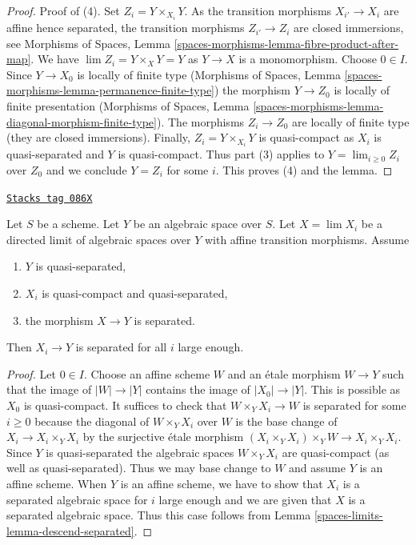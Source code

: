 \begin{proof}
\medskip\noindent
Proof of (4). Set $Z_i = Y \times_{X_i} Y$.
As the transition morphisms $X_{i'} \to X_i$ are affine hence separated,
the transition morphisms $Z_{i'} \to Z_i$ are closed immersions, see
Morphisms of Spaces, Lemma
\ref{spaces-morphisms-lemma-fibre-product-after-map}.
We have $\lim Z_i = Y \times_X Y = Y$ as $Y \to X$ is a monomorphism.
Choose $0 \in I$. Since $Y \to X_0$ is locally of finite type
(Morphisms of Spaces, Lemma
\ref{spaces-morphisms-lemma-permanence-finite-type})
the morphism $Y \to Z_0$ is locally of finite presentation
(Morphisms of Spaces, Lemma
\ref{spaces-morphisms-lemma-diagonal-morphism-finite-type}).
The morphisms $Z_i \to Z_0$ are locally of finite type
(they are closed immersions).
Finally, $Z_i = Y \times_{X_i} Y$ is quasi-compact as
$X_i$ is quasi-separated and $Y$ is quasi-compact.
Thus part (3) applies to $Y = \lim_{i \geq 0} Z_i$ over $Z_0$
and we conclude $Y = Z_i$ for some $i$. This proves (4) and the lemma.
\end{proof}

\begin{lemma}
\label{spaces-limits-lemma-eventually-separated}
\href{https://stacks.math.columbia.edu/tag/086X}{\texttt{Stacks tag 086X}}

Let $S$ be a scheme. Let $Y$ be an algebraic space over $S$.
Let $X = \lim X_i$ be a directed limit of algebraic spaces over $Y$
with affine transition morphisms. Assume
\begin{enumerate}
\item $Y$ is quasi-separated,
\item $X_i$ is quasi-compact and quasi-separated,
\item the morphism $X \to Y$ is separated.
\end{enumerate}
Then $X_i \to Y$ is separated for all $i$ large enough.
\end{lemma}

\begin{proof}
Let $0 \in I$. Choose an affine scheme $W$ and an \'etale morphism
$W \to Y$ such that the image of $|W| \to |Y|$ contains the image of
$|X_0| \to |Y|$. This is possible as $X_0$ is quasi-compact.
It suffices to check that $W \times_Y X_i \to W$ is separated
for some $i \geq 0$ because the diagonal of $W \times_Y X_i$
over $W$ is the base change of $X_i \to X_i \times_Y X_i$ by
the surjective \'etale morphism $(X_i \times_Y X_i) \times_Y W \to
X_i \times_Y X_i$. Since $Y$ is quasi-separated the algebraic spaces
$W \times_Y X_i$ are quasi-compact (as well as quasi-separated).
Thus we may base change to $W$ and assume $Y$ is an affine scheme.
When $Y$ is an affine scheme, we have to show that $X_i$ is a
separated algebraic space for $i$ large enough and we are given that
$X$ is a separated algebraic space. Thus this case follows from
Lemma \ref{spaces-limits-lemma-descend-separated}.
\end{proof}

